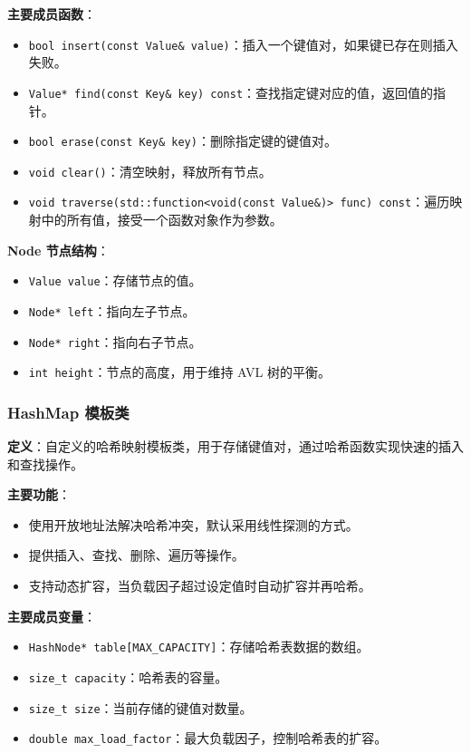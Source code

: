 \documentclass[UTF8, a4paper,12pt]{ctexart}
\begin{document}
\textbf{主要成员函数}：

\begin{itemize}
    \item \texttt{bool insert(const Value\& value)}：插入一个键值对，如果键已存在则插入失败。
    \item \texttt{Value* find(const Key\& key) const}：查找指定键对应的值，返回值的指针。
    \item \texttt{bool erase(const Key\& key)}：删除指定键的键值对。
    \item \texttt{void clear()}：清空映射，释放所有节点。
    \item \texttt{void traverse(std::function<void(const Value\&)> func) const}：遍历映射中的所有值，接受一个函数对象作为参数。
\end{itemize}

\textbf{Node 节点结构}：

\begin{itemize}
    \item \texttt{Value value}：存储节点的值。
    \item \texttt{Node* left}：指向左子节点。
    \item \texttt{Node* right}：指向右子节点。
    \item \texttt{int height}：节点的高度，用于维持 AVL 树的平衡。
\end{itemize}

\subsubsection{HashMap 模板类}

\textbf{定义}：自定义的哈希映射模板类，用于存储键值对，通过哈希函数实现快速的插入和查找操作。

\textbf{主要功能}：

\begin{itemize}
    \item 使用开放地址法解决哈希冲突，默认采用线性探测的方式。
    \item 提供插入、查找、删除、遍历等操作。
    \item 支持动态扩容，当负载因子超过设定值时自动扩容并再哈希。
\end{itemize}

\textbf{主要成员变量}：

\begin{itemize}
    \item \texttt{HashNode* table[MAX\_CAPACITY]}：存储哈希表数据的数组。
    \item \texttt{size\_t capacity}：哈希表的容量。
    \item \texttt{size\_t size}：当前存储的键值对数量。
    \item \texttt{double max\_load\_factor}：最大负载因子，控制哈希表的扩容。
\end{itemize}
\end{document}
